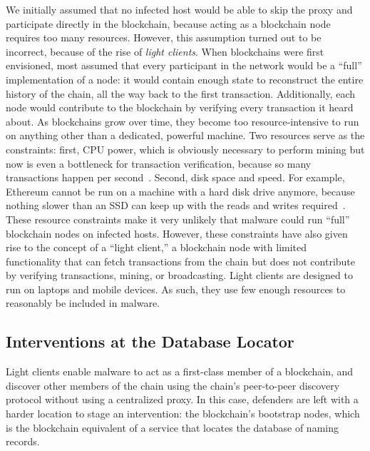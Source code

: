 We initially assumed that no infected host would be able to 
skip the proxy and participate directly 
in the blockchain, because acting as a blockchain node 
requires too many resources. However, this assumption turned 
out to be incorrect, because of the rise of \emph{light 
clients}. When blockchains were first envisioned, most 
assumed that every participant in the network would be a 
``full'' implementation of a node: it would contain 
enough state to reconstruct the entire history of the chain, 
all the way back to the first transaction. Additionally, each 
node would contribute to the 
blockchain by verifying every transaction it heard about. As 
blockchains grow over time, they become too 
resource-intensive to run on anything other than a dedicated, 
powerful machine. Two resources serve as 
the constraints: first, CPU power, which is obviously 
necessary to perform mining but now is even a bottleneck for 
transaction verification, because so many transactions happen 
per second~\cite{citation_needed}. Second, disk 
space and speed. For example, Ethereum cannot be run on a 
machine with a hard disk drive anymore, because nothing 
slower than an SSD can keep up with the 
reads and writes required~\cite{citation_needed}.  These resource constraints make it 
very unlikely that malware could run ``full'' blockchain 
nodes on infected hosts. However, these constraints have also
given rise to the concept of a ``light client,'' a blockchain 
node with limited functionality that can fetch transactions 
from the chain but does not contribute by verifying 
transactions, mining, or broadcasting. Light clients are 
designed to run on laptops and mobile devices. As such, they 
use few enough resources to reasonably be included in 
malware. 


\subsection{Interventions at the Database Locator}

Light clients enable malware to act as a first-class member 
of a blockchain, and discover other members of the chain 
using the chain's peer-to-peer discovery protocol without 
using a centralized proxy. In this case, defenders are left 
with a harder location to stage an intervention: the 
blockchain's bootstrap nodes, which is the blockchain 
equivalent of a service that locates the database of naming 
records.

